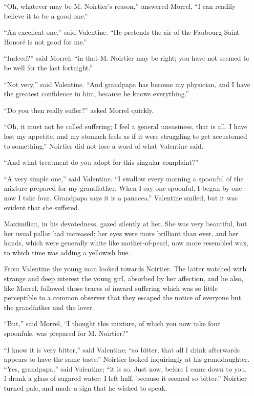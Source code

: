 “Oh, whatever may be M. Noirtier’s reason,” answered Morrel, “I can
readily believe it to be a good one.”

“An excellent one,” said Valentine. “He pretends the air of the
Faubourg Saint-Honoré is not good for me.”

“Indeed?” said Morrel; “in that M. Noirtier may be right; you have not
seemed to be well for the last fortnight.”

“Not very,” said Valentine. “And grandpapa has become my physician, and
I have the greatest confidence in him, because he knows everything.”

“Do you then really suffer?” asked Morrel quickly.

“Oh, it must not be called suffering; I feel a general uneasiness, that
is all. I have lost my appetite, and my stomach feels as if it were
struggling to get accustomed to something.” Noirtier did not lose a
word of what Valentine said.

“And what treatment do you adopt for this singular complaint?”

“A very simple one,” said Valentine. “I swallow every morning a
spoonful of the mixture prepared for my grandfather. When I say one
spoonful, I began by one—now I take four. Grandpapa says it is a
panacea.” Valentine smiled, but it was evident that she suffered.

Maximilian, in his devotedness, gazed silently at her. She was very
beautiful, but her usual pallor had increased; her eyes were more
brilliant than ever, and her hands, which were generally white like
mother-of-pearl, now more resembled wax, to which time was adding a
yellowish hue.

From Valentine the young man looked towards Noirtier. The latter
watched with strange and deep interest the young girl, absorbed by her
affection, and he also, like Morrel, followed those traces of inward
suffering which was so little perceptible to a common observer that
they escaped the notice of everyone but the grandfather and the lover.

“But,” said Morrel, “I thought this mixture, of which you now take four
spoonfuls, was prepared for M. Noirtier?”

“I know it is very bitter,” said Valentine; “so bitter, that all I
drink afterwards appears to have the same taste.” Noirtier looked
inquiringly at his granddaughter. “Yes, grandpapa,” said Valentine; “it
is so. Just now, before I came down to you, I drank a glass of sugared
water; I left half, because it seemed so bitter.” Noirtier turned pale,
and made a sign that he wished to speak.

